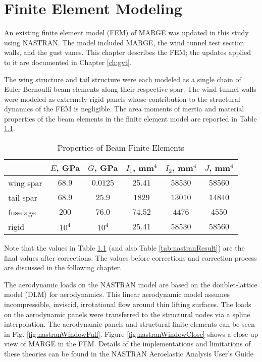 \chapter{Finite Element Modeling}
\label{ch:nastran}

An existing finite element model (FEM) of MARGE was updated in this study using NASTRAN. The model included MARGE, the wind tunnel test section walls, and the gust vanes. This chapter describes the FEM; the updates applied to it are documented in Chapter \ref{ch:gvt}.

The wing structure and tail structure were each modeled as a single chain of Euler-Bernoulli beam elements along their respective spar. The wind tunnel walls were modeled as extremely rigid panels whose contribution to the structural dynamics of the FEM is negligible. The area moments of inertia and material properties of the beam elements in the finite element model are reported in Table \ref{tab:beamInertia}.
\begin{table}[H]
    \centering
    \caption{Properties of Beam Finite Elements}
    \label{tab:beamInertia}
    \begin{tabular}{lccccc}
        \hline\hline
                  & $E$, GPa & $G$, GPa & $I_1$, mm$^4$ & $I_2$, mm$^4$ & $J$, mm$^4$ \\
        \hline
        wing spar & $68.9$   & $0.0125$ & $25.41$       & $58530$       & $58560$     \\
        tail spar & $68.9$   & $25.9$   & $1829$        & $13010$       & $14840$     \\
        fuselage  & $200$    & $76.0$   & $74.52$       & $4476 $       & $4550 $     \\
        rigid     & $10^4$   & $10^4$   & $25.41$       & $58530$       & $58560$     \\
        \hline\hline
    \end{tabular}
\end{table}
Note that the values in Table \ref{tab:beamInertia} (and also Table \ref{tab:nastranResult}) are the final values after corrections. The values before corrections and correction process are discussed in the following chapter.

The aerodynamic loads on the NASTRAN model are based on the doublet-lattice model (DLM) for aerodynamics. This linear aerodynamic model assumes incompressible, inviscid, irrotational flow around thin lifting surfaces. The loads on the aerodynamic panels were transferred to the structural nodes via a spline interpolation. The aerodynamic panels and structural finite elements can be seen in Fig. \ref{fig:nastranWindowFull}. Figure \ref{fig:nastranWindowClose} shows a close-up view of MARGE in the FEM. Details of the implementations and limitations of these theories can be found in the NASTRAN Aeroelastic Analysis User's Guide \cite{Siemens2020}

